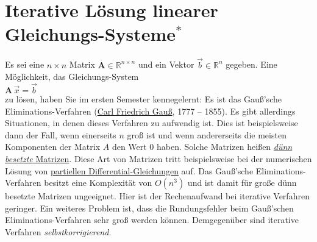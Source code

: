 \section{Iterative L\"osung linearer Gleichungs-Systeme$^*$}
Es sei eine $n\times n$ Matrix $\mathbf{A} \in \mathbb{R}^{n\times n}$ und ein Vektor
 $\vec{b}\in \mathbb{R}^n$ gegeben.  Eine M\"oglichkeit, 
das Glei\-chungs-System 
\\[0.2cm]
\hspace*{1.3cm}
$\mathbf{A}\, \vec{x} = \vec{b}$
\\[0.2cm]
zu l\"osen, haben Sie im ersten Semester kennegelernt: Es ist das Gau{\ss}'sche
Eliminations-Verfahren (\href{https://de.wikipedia.org/wiki/Carl_Friedrich_Gauss}{Carl Friedrich Gau{\ss}}, 1777 -- 1855).  
Es gibt allerdings Situationen, in denen dieses
Verfahren zu 
aufwendig ist.  Dies ist beispielsweise dann der Fall, wenn einerseits $n$ gro{\ss} ist und
wenn andererseits die meisten Komponenten der Matrix $A$ den Wert 0 haben.  Solche
Matrizen hei{\ss}en 
\href{https://de.wikipedia.org/w/index.php?title=Schwachbesetzte_Matrix&redirect=yes}{\emph{d\"unn
    besetzte} Matrizen}.  Diese Art von Matrizen tritt beispielsweise bei  
der numerischen L\"osung von
\href{http://de.wikipedia.org/wiki/Partielle_Differentialgleichung}{partiellen Differential-Gleichungen} auf.   
Das Gau{\ss}'sche Eliminations-Verfahren besitzt  eine
Komplexit\"at von $O(n^3)$ und ist damit f\"ur gro{\ss}e d\"unn besetzte Matrizen ungeeignet.
Hier ist der Rechenaufwand bei iterative Verfahren geringer.   
Ein weiteres Problem ist, dass die Rundungsfehler beim Gau{\ss}'schen Eliminations-Verfahren
sehr gro{\ss} werden k\"onnen.  Demgegen\"uber sind iterative Verfahren \emph{selbstkorrigierend}.

